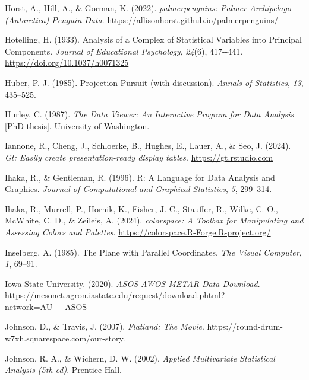 \documentclass[
  letterpaper,
]{krantz}
\newcounter{none} %
\newlength{\cslhangindent}
\newenvironment{CSLReferences}[2] %
 {\begin{list}{}{%
  \setlength{\itemindent}{0pt}
  \setlength{\leftmargin}{0pt}
  \setlength{\parsep}{0pt}
  \ifodd #1
   \setlength{\leftmargin}{\cslhangindent}
   \setlength{\itemindent}{-1\cslhangindent}
  \fi
  \setlength{\itemsep}{#2\baselineskip}}}
 {\end{list}}
\begin{document}
\begin{CSLReferences}{1}{0}
Horst, A., Hill, A., \& Gorman, K. (2022). \emph{{palmerpenguins}:
{P}almer {A}rchipelago ({A}ntarctica) {P}enguin {D}ata}.
\url{https://allisonhorst.github.io/palmerpenguins/}

Hotelling, H. (1933). Analysis of a {C}omplex of {S}tatistical
{V}ariables into {P}rincipal {C}omponents. \emph{Journal of Educational
Psychology}, \emph{24}(6), 417-\/-441.
\url{https://doi.org/10.1037/h0071325}

Huber, P. J. (1985). {P}rojection {P}ursuit (with discussion).
\emph{Annals of Statistics}, \emph{13}, 435--525.

Hurley, C. (1987). \emph{The {D}ata {V}iewer: An {I}nteractive {P}rogram
for {D}ata {A}nalysis} {[}PhD thesis{]}. University of Washington.

Iannone, R., Cheng, J., Schloerke, B., Hughes, E., Lauer, A., \& Seo, J.
(2024). \emph{Gt: Easily create presentation-ready display tables}.
\url{https://gt.rstudio.com}

Ihaka, R., \& Gentleman, R. (1996). R: {A} {L}anguage for {D}ata
{A}nalysis and {G}raphics. \emph{Journal of Computational and Graphical
Statistics}, \emph{5}, 299--314.

Ihaka, R., Murrell, P., Hornik, K., Fisher, J. C., Stauffer, R., Wilke,
C. O., McWhite, C. D., \& Zeileis, A. (2024). \emph{{colorspace}: {A}
{T}oolbox for {M}anipulating and {A}ssessing {C}olors and {P}alettes}.
\url{https://colorspace.R-Forge.R-project.org/}

Inselberg, A. (1985). {T}he {P}lane with {P}arallel {C}oordinates.
\emph{The Visual Computer}, \emph{1}, 69--91.

Iowa State University. (2020). \emph{ASOS-AWOS-METAR {D}ata {D}ownload}.
\url{https://mesonet.agron.iastate.edu/request/download.phtml?network=AU__ASOS}

Johnson, D., \& Travis, J. (2007). \emph{Flatland: The {M}ovie}.
https://round-drum-w7xh.squarespace.com/our-story.

Johnson, R. A., \& Wichern, D. W. (2002). \emph{Applied {M}ultivariate
{S}tatistical {A}nalysis (5th ed)}. Prentice-Hall.


\end{CSLReferences}
\end{document}
